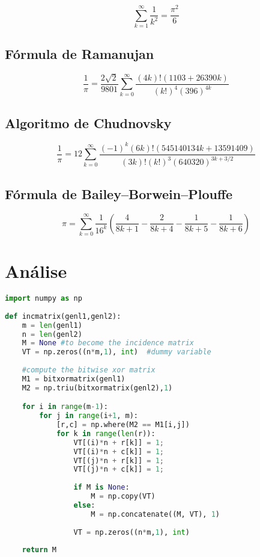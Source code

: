 \documentclass[12pt]{article}
\begin{document}
\[\sum\limits_{k=1}^{\infty}\frac{1}{k^{2}}=\frac{\pi^{2}}{6}\]


\subsection{Fórmula de Ramanujan}

\[\frac{1}{\pi}=\frac{2\sqrt{2}}{9801}\sum\limits_{k=0}^{\infty}\frac{(4k)!(1103+26390k)}{(k!)^{4}(396)^{4k}}\]

\subsection{Algoritmo de Chudnovsky}

\[\frac{1}{\pi}=12\sum\limits_{k=0}^{\infty}\frac{(-1)^{k}(6k)!(545140134k+13591409)}{(3k)!(k!)^{3}(640320)^{3k+3/2}}\]

\subsection{Fórmula de Bailey–Borwein–Plouffe}

\[\pi=\sum\limits_{k=0}^{\infty}\frac{1}{16^{k}}(\frac{4}{8k+1}-\frac{2}{8k+4}-\frac{1}{8k+5}-\frac{1}{8k+6})\]

\section{Análise}

\begin{lstlisting}[language=Python]
import numpy as np
    
def incmatrix(genl1,genl2):
    m = len(genl1)
    n = len(genl2)
    M = None #to become the incidence matrix
    VT = np.zeros((n*m,1), int)  #dummy variable
    
    #compute the bitwise xor matrix
    M1 = bitxormatrix(genl1)
    M2 = np.triu(bitxormatrix(genl2),1) 

    for i in range(m-1):
        for j in range(i+1, m):
            [r,c] = np.where(M2 == M1[i,j])
            for k in range(len(r)):
                VT[(i)*n + r[k]] = 1;
                VT[(i)*n + c[k]] = 1;
                VT[(j)*n + r[k]] = 1;
                VT[(j)*n + c[k]] = 1;
                
                if M is None:
                    M = np.copy(VT)
                else:
                    M = np.concatenate((M, VT), 1)
                
                VT = np.zeros((n*m,1), int)
    
    return M
\end{lstlisting}
\end{document}
